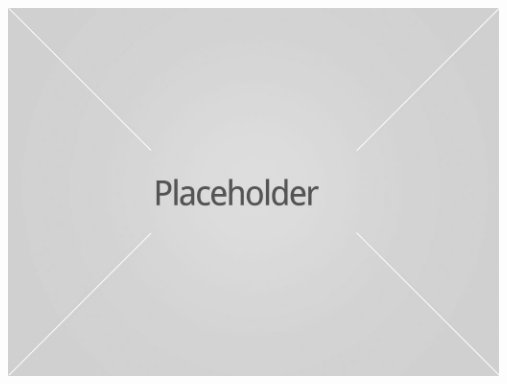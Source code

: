 \documentclass[hidelinks, 12pt, oneside]{article}
\begin{document}
\begin{itemize}
\includegraphics[width=13cm]{image.jpg}
    \rule{0\linewidth}{0.15\linewidth}\par
\end{itemize}
\end{document}
